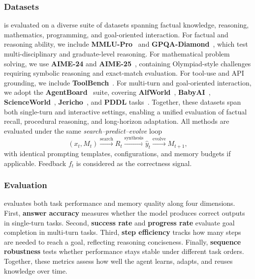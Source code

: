 \subsubsection{Datasets}
\method is evaluated on a diverse suite of datasets spanning factual knowledge, reasoning, mathematics, programming, and goal-oriented interaction.  
For factual and reasoning ability, we include \textbf{MMLU-Pro}~\citep{zheng2024mmlu} and \textbf{GPQA-Diamond}~\citep{rein2023gpqa}, which test multi-disciplinary and graduate-level reasoning.  
For mathematical problem solving, we use \textbf{AIME-24} and \textbf{AIME-25}~\citep{aime2024}, containing Olympiad-style challenges requiring symbolic reasoning and exact-match evaluation.  
For tool-use and API grounding, we include \textbf{ToolBench}~\citep{patil2023gorilla}.  
For multi-turn and goal-oriented interaction, we adopt the \textbf{AgentBoard}~\citep{zhuang2024agentboard} suite, covering \textbf{AlfWorld}~\citep{shridhar2021alfworld}, \textbf{BabyAI}~\citep{chevalier2018babyai}, \textbf{ScienceWorld}~\citep{wang2022scienceworld}, \textbf{Jericho}~\citep{hausknecht2019interactive}, and \textbf{PDDL} tasks~\citep{yang2023pddlbench}.  
Together, these datasets span both single-turn and interactive settings, enabling a unified evaluation of factual recall, procedural reasoning, and long-horizon adaptation. All methods are evaluated under the same \emph{search–predict–evolve} loop
\[
(x_t, M_t) \xrightarrow{\text{search}} R_t \xrightarrow{\text{synthesis}} \hat{y}_t \xrightarrow{\text{evolve}} M_{t+1},
\]
with identical prompting templates, configurations, and memory budgets if applicable. Feedback $f_t$ is considered as the correctness signal. 

\subsubsection{Evaluation}
\method evaluates both task performance and memory quality along four dimensions.
First, \textbf{answer accuracy} measures whether the model produces correct outputs in single-turn tasks.
Second, \textbf{success rate} and \textbf{progress rate} evaluate goal completion in multi-turn tasks.
Third, \textbf{step efficiency} tracks how many steps are needed to reach a goal, reflecting reasoning conciseness.
Finally, \textbf{sequence robustness} tests whether performance stays stable under different task orders.
Together, these metrics assess how well the agent learns, adapts, and reuses knowledge over time.

